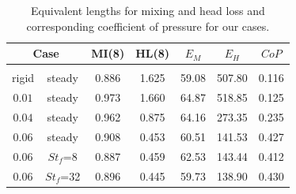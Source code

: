 \documentclass[%
 aip,
 amsmath,amssymb,
 reprint,
]{revtex4-1}
\begin{document}
\begin{table}
	\caption{\label{tab:table1}Equivalent lengths for mixing and head loss and corresponding coefficient of pressure for our cases.}
	\begin{ruledtabular}
		\begin{tabular}{ccccccc}
			\multicolumn{2}{c}{Case} & MI(8) & HL(8) & $E_M$ & $E_H$ & $CoP$\\
			\hline \\
		rigid & steady& 0.886 &1.625 &59.08 &507.80 & 0.116\\
		$0.01$ & steady&  0.973& 1.660 &64.87 &518.85 &  0.125\\
		$0.04$ & steady&  0.962& 0.875 &64.16 &273.35 & 0.235\\
		$0.06$ & steady&  0.908& 0.453 &60.51 &141.53 & 0.427\\
		$0.06$ & $St_f$=8& 0.887& 0.459 &62.53 &143.44 & 0.412\\
		$0.06$ & $St_f$=32&0.896 &0.445 &59.73 &138.90 & 0.430\\
		\end{tabular}
	\end{ruledtabular}
\end{table}
\end{document}
